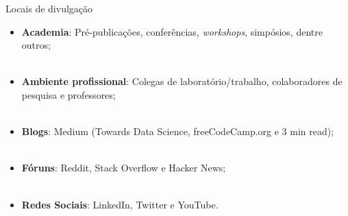 \begin{frame}{Locais de divulgação}
	\justify
	\begin{itemize}
		\item \textbf{Academia}: Pré-publicações, conferências, \emph{workshops}, simpósios, dentre outros;
		\\~\\
		\item \textbf{Ambiente profissional}: Colegas de laboratório/trabalho, colaboradores de pesquisa e professores;
		\\~\\
		\item \textbf{Blogs}: Medium (Towards Data Science, freeCodeCamp.org e 3 min read);
		\\~\\
		\item \textbf{Fóruns}: Reddit, Stack Overflow e Hacker News;
		\\~\\
		\item \textbf{Redes Sociais}: LinkedIn, Twitter e YouTube.
	\end{itemize}
\end{frame}